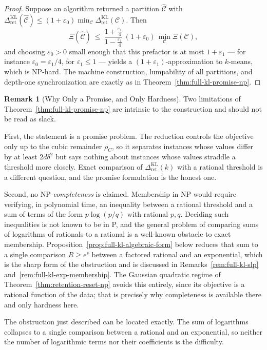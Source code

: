 \documentclass[12pt]{article}
\theoremstyle{definition}
\newtheorem{remark}[theorem]{Remark}
\newcommand{\RetKL}{\Delta_{\mathrm{ret}}^{\mathrm{KL}}}
\begin{document}
\begin{proof}
Suppose an algorithm returned a partition $\widehat{\mathcal C}$ with
$\RetKL(\widehat{\mathcal C})\le(1+\varepsilon_0)\min_{\mathcal C}
\RetKL(\mathcal C)$.  Then
\[
\Xi(\widehat{\mathcal C})
\ \le\
\frac{1+\tfrac{\varepsilon_1}{4}}{1-\tfrac{\varepsilon_1}{4}}
\,(1+\varepsilon_0)\,
\min_{\mathcal C}\Xi(\mathcal C),
\]
and choosing $\varepsilon_0>0$ small enough that this prefactor is at most
$1+\varepsilon_1$ --- for instance $\varepsilon_0=\varepsilon_1/4$, for
$\varepsilon_1\le1$ --- yields a $(1+\varepsilon_1)$-approximation to
$k$-means, which is NP-hard.  The machine construction, lumpability of all
partitions, and depth-one synchronization are exactly as in
Theorem~\ref{thm:full-kl-promise-np}.
\end{proof}

\begin{remark}[Why Only a Promise, and Only Hardness]
\label{rem:full-kl-promise-scope}
Two limitations of Theorem~\ref{thm:full-kl-promise-np} are intrinsic to the
construction and should not be read as slack.

First, the statement is a promise problem.  The reduction controls the objective
only up to the cubic remainder $\rho_C$, so it separates instances whose values
differ by at least $2d\delta^2$ but says nothing about instances whose values
straddle a threshold more closely.  Exact comparison of $\RetKL(k)$ with a
rational threshold is a different question, and the promise formulation is the
honest one.

Second, no NP-\emph{completeness} is claimed.  Membership in NP would require
verifying, in polynomial time, an inequality between a rational threshold and a
sum of terms of the form $p\log(p/q)$ with rational $p,q$.  Deciding such
inequalities is not known to be in P, and the general problem of comparing sums
of logarithms of rationals to a rational is a well-known obstacle to exact
membership.  Proposition~\ref{prop:full-kl-algebraic-form} below reduces that
sum to a single comparison $R\ge e^{s}$ between a factored rational and an
exponential, which is the sharp form of the obstruction and is discussed in
Remarks~\ref{rem:full-kl-slp} and~\ref{rem:full-kl-exp-membership}.  The Gaussian quadratic regime of
Theorem~\ref{thm:retention-reset-np} avoids this entirely, since its objective
is a rational function of the data; that is precisely why completeness is
available there and only hardness here.
\end{remark}

The obstruction just described can be located exactly.  The sum of logarithms
collapses to a single comparison between a rational and an exponential, so
neither the number of logarithmic terms nor their coefficients is the
difficulty.
\end{document}
